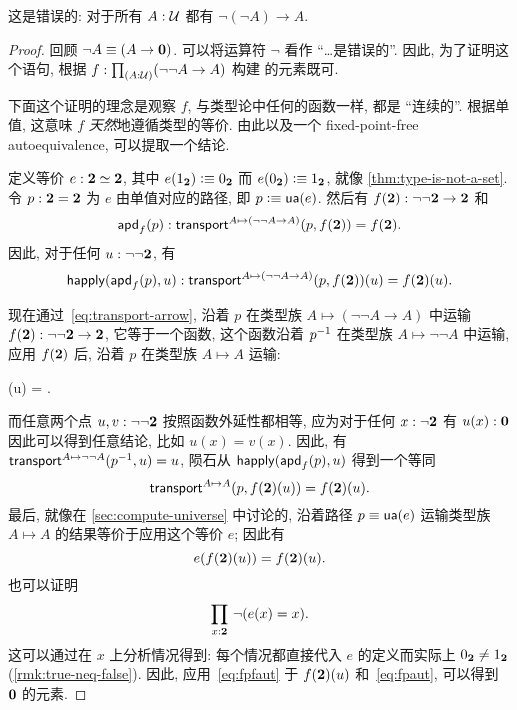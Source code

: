 \begin{thm}
    \label{thm:not-dneg}
    这是错误的: 对于所有 $A:\mathcal{U}$ 都有 $\neg(\neg A) \to A$.
\end{thm}
\begin{proof}
    回顾 $\neg A \equiv (A\to\mathbf{0})$.
    可以将运算符 $\neg$ 看作 ``\dots 是错误的''.
    因此, 为了证明这个语句, 根据 $f:\prd{A:\UU} (\neg\neg A \to A)$ 构建 \emptyt 的元素既可.

    下面这个证明的理念是观察 $f$, 与类型论中任何的函数一样, 都是 ``连续的''.
    根据单值, 这意味 $f$ \emph{天然}地遵循类型的等价.
    由此以及一个 fixed-point-free autoequivalence, 可以提取一个结论.

    定义等价 $e:\mathbf{2} \simeq \mathbf{2}$, 其中 $e({1_{\mathbf{2}}})\vcentcolon\equiv{0_{\ensuremath{\mathbf{2}}}}$ 而 $e({0_{\mathbf{2}}})\vcentcolon\equiv{1_{\ensuremath{\mathbf{2}}}}$, 就像 \cref{thm:type-is-not-a-set}.
    令 $p:\mathbf{2}=\mathbf{2}$ 为 $e$ 由单值对应的路径, 即 $p\vcentcolon\equiv \mathsf{ua}(e)$.
    然后有 $f(\mathbf{2}) : \neg\neg\mathbf{2} \to\mathbf{2}$ 和
    \[\mathsf{apd}_{f}\mathopen{}\left(p\right)\mathclose{} : \mathsf{transport}^{A\mapsto (\neg\neg A \to A)}(p,f(\mathbf{2})) = f(\mathbf{2}).\]
    因此, 对于任何 $u:\neg\neg\mathbf{2}$, 有
    \[\mathsf{happly}(\mathsf{apd}_{f}\mathopen{}\left(p\right)\mathclose{},u) : \mathsf{transport}^{A\mapsto (\neg\neg A \to A)}(p,f(\mathbf{2}))(u) = f(\mathbf{2})(u).\]

    现在通过~\eqref{eq:transport-arrow}, 沿着 $p$ 在类型族 ${A\mapsto (\neg\neg A \to A)}$ 中运输 $f(\mathbf{2}):\neg\neg\mathbf{2}\to\mathbf{2}$, 它等于一个函数, 这个函数沿着 $\mathord{{p}^{-1}}$ 在类型族 $A\mapsto \neg\neg A$ 中运输, 应用 $f(\mathbf{2})$ 后, 沿着 $p$ 在类型族 $A\mapsto A$ 运输:
    \begin{narrowmultline*}
        (u) =
        \narrowbreak
        .
    \end{narrowmultline*}
    而任意两个点 $u,v:\neg\neg\mathbf{2}$ 按照函数外延性都相等, 应为对于任何 $x:\neg\mathbf{2}$ 有 $u(x):\mathbf{0}$ 因此可以得到任意结论, 比如 $u(x)=v(x)$.
    因此, 有 $\mathsf{transport}^{A\mapsto \neg\neg A}(\mathord{{p}^{-1}},u) = u$, 陨石从 $\mathsf{happly}(\mathsf{apd}_{f}\mathopen{}\left(p\right)\mathclose{},u)$ 得到一个等同
    \[ \mathsf{transport}^{A\mapsto A}(p,f(\mathbf{2})(u)) = f(\mathbf{2})(u).\]
    最后, 就像在 \cref{sec:compute-universe} 中讨论的, 沿着路径 $p\equiv \mathsf{ua}(e)$ 运输类型族 $A\mapsto A$ 的结果等价于应用这个等价 $e$;
    因此有
    \begin{equation}
        e(f(\bool)(u)) = f(\bool)(u).\label{eq:fpaut}
    \end{equation}
    也可以证明
    \begin{equation}
        \prd{x:\bool} \neg(e(x)=x).\label{eq:fpfaut}
    \end{equation}
    这可以通过在 $x$ 上分析情况得到: 每个情况都直接代入 $e$ 的定义而实际上 ${0_{\mathbf{2}}}\neq{1_{\ensuremath{\mathbf{2}}}}$ (\cref{rmk:true-neq-false}).
    因此, 应用~\eqref{eq:fpfaut} 于 $f(\mathbf{2})(u)$ 和~\eqref{eq:fpaut}, 可以得到 $\mathbf{0}$ 的元素.
\end{proof}

